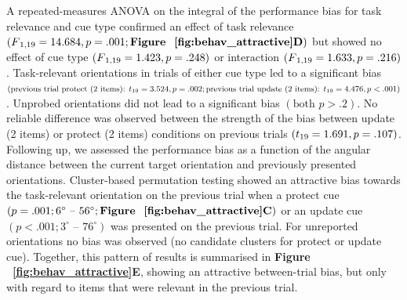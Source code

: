 \documentclass{article}
\begin{document}
\begin{large}
A repeated-measures ANOVA on the integral of the performance bias for task relevance and cue type confirmed an effect of task relevance $(F\textsubscript{1,19}  = 14.684, p = .001; \text{\textbf{Figure ~\ref{fig:behav_attractive}D}})$ but showed no effect of cue type $(F\textsubscript{1,19}  = 1.423, p = .248)$ or interaction $(F\textsubscript{1,19} = 1.633, p = .216)$. Task-relevant orientations in trials of either cue type led to a significant bias $(\text{previous trial protect (2 items): } t\textsubscript{19} = 3.524, p = .002; \text{previous trial update (2 items): } t\textsubscript{19} = 4.476, p < .001)$. Unprobed orientations did not lead to a significant bias $(\text{both } p > .2)$. No reliable difference was observed between the strength of the bias between update (2 items) or protect (2 items) conditions on previous trials $(t\textsubscript{19} = 1.691, p = .107)$. Following up, we assessed the performance bias as a function of the angular distance between the current target orientation and previously presented orientations. Cluster-based permutation testing showed an attractive bias towards the task-relevant orientation on the previous trial when a protect cue $(p = .001; 6^\circ \text{ – } 56^\circ; \text{\textbf{Figure ~\ref{fig:behav_attractive}C}})$ or an update cue $(p < .001; 3^\circ \text{ – } 76^\circ)$ was presented on the previous trial. For unreported orientations no bias was observed (no candidate clusters for protect or update cue). Together, this pattern of results is summarised in \textbf{Figure ~\ref{fig:behav_attractive}E}, showing an attractive between-trial bias, but only with regard to items that were relevant in the previous trial. \\



\end{large}
\end{document}
